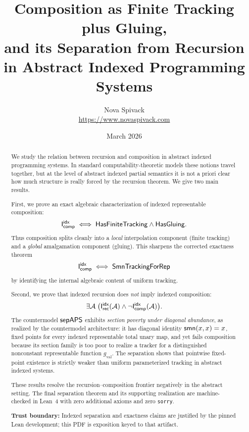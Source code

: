 \documentclass[11pt]{article}
\title{Composition as Finite Tracking plus Gluing,\\and its Separation from Recursion\\in Abstract Indexed Programming Systems}
\author{Nova Spivack\\\url{https://www.novaspivack.com}}
\date{March 2026}
\begin{document}
\maketitle
\NovaZenodoAfterTitle


\begin{abstract}
\raggedright
We study the relation between recursion and composition in abstract indexed programming systems.  In standard computability-theoretic models these notions travel together, but at the level of abstract indexed partial semantics it is not a priori clear how much structure is really forced by the recursion theorem.  We give two main results.

First, we prove an exact algebraic characterization of indexed representable composition:
\[
\mathsf{I}_{\mathsf{comp}}^{\mathsf{idx}} \;\Longleftrightarrow\; \mathsf{HasFiniteTracking} \wedge \mathsf{HasGluing}.
\]
Thus composition splits cleanly into a \emph{local} interpolation component (finite tracking) and a \emph{global} amalgamation component (gluing).  This sharpens the corrected exactness theorem
\[
\mathsf{I}_{\mathsf{comp}}^{\mathsf{idx}} \;\Longleftrightarrow\; \mathsf{SmnTrackingForRep}
\]
by identifying the internal algebraic content of uniform tracking.

Second, we prove that indexed recursion does \emph{not} imply indexed composition:
\[
\exists \mathcal{A}\; \bigl(\mathsf{I}_{\mathsf{rec}}^{\mathsf{idx}}(\mathcal{A}) \wedge \neg \mathsf{I}_{\mathsf{comp}}^{\mathsf{idx}}(\mathcal{A})\bigr).
\]
The countermodel \(\mathsf{sepAPS}\) exhibits \emph{section poverty under diagonal abundance}, as realized by the countermodel architecture: it has diagonal identity \(\mathsf{smn}(x,x)=x\), fixed points for every indexed representable total unary map, and yet fails composition because its section family is too poor to realize a tracker for a distinguished nonconstant representable function \(g_{\mathrm{val}}\).  The separation shows that pointwise fixed-point existence is strictly weaker than uniform parameterized tracking in abstract indexed systems.

These results resolve the recursion--composition frontier negatively in the abstract setting.  The final separation theorem and its supporting realization are machine-checked in Lean~4 with zero additional axioms and zero \texttt{sorry}.

\textbf{Trust boundary:} Indexed separation and exactness claims are justified by the pinned Lean development; this PDF is exposition keyed to that artifact.

\NovaZenodoInAbstract
\end{abstract}

\end{document}
